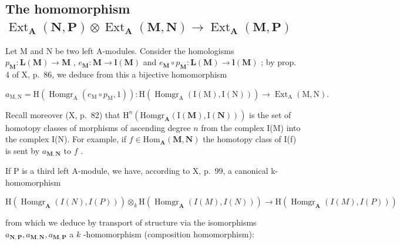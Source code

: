 \subsection{\texorpdfstring{The homomorphism \(\operatorname{Ext}_{\mathbf{A}}(\mathbf{N}, \mathbf{P}) \otimes \operatorname{Ext}_{\mathbf{A}}(\mathbf{M}, \mathbf{N}) \to \operatorname{Ext}_{\mathbf{A}}(\mathbf{M}, \mathbf{P})\)}{The homomorphism \textbackslash operatorname\{Ext\}\_\{\textbackslash mathbf\{A\}\}(\textbackslash mathbf\{N\}, \textbackslash mathbf\{P\}) \textbackslash otimes \textbackslash operatorname\{Ext\}\_\{\textbackslash mathbf\{A\}\}(\textbackslash mathbf\{M\}, \textbackslash mathbf\{N\}) \textbackslash to \textbackslash operatorname\{Ext\}\_\{\textbackslash mathbf\{A\}\}(\textbackslash mathbf\{M\}, \textbackslash mathbf\{P\})}}

Let M and N be two left A-modules. Consider the homologisms \(p_{\mathbf{M}}: \mathbf{L}(\mathbf{M}) \to \mathbf{M}\) , \(e_{\mathbf{M}}: \mathbf{M} \to \mathbf{l}(\mathbf{M})\) and \(e_{\mathbf{M}} \circ p_{\mathbf{M}}: \mathbf{L}(\mathbf{M}) \to \mathbf{l}(\mathbf{M})\) ; by prop. 4 of X, p.~86, we deduce from this a bijective homomorphism

\[
a _ {\mathrm{M}, \mathrm{N}} = \mathrm{H} (\operatorname{Homgr} _ {\mathrm{A}} (e _ {\mathrm{M}} \circ p _ {\mathrm{M}}, 1)): \mathrm{H} (\operatorname{Homgr} _ {\mathrm{A}} (\mathrm{I} (\mathrm{M}), \mathrm{I} (\mathrm{N}))) \rightarrow \operatorname{Ext} _ {\mathrm{A}} (\mathrm{M}, \mathrm{N}).
\]

Recall moreover (X, p.~82) that \(\mathrm{H}^n (\mathrm{Homgr}_{\mathbf{A}}(\mathrm{I}(\mathbf{M}),\mathrm{I}(\mathbf{N})))\) is the set of homotopy classes of morphisms of ascending degree \(n\) from the complex I(M) into the complex I(N). For example, if \(f\in \mathrm{Hom}_{\mathbf{A}}(\mathbf{M},\mathbf{N})\) the homotopy class of I(f) is sent by \(a_{\mathbf{M},\mathbf{N}}\) to \(f\) .

If P is a third left A-module, we have, according to X, p.~99, a canonical k-homomorphism

\[
\mathrm{H} (\operatorname{Homgr} _ {\mathbf {A}} (I (N), I (P))) \otimes_ {k} \mathrm{H} (\operatorname{Homgr} _ {\mathbf {A}} (I (M), I (N))) \rightarrow \mathrm{H} (\operatorname{Homgr} _ {\mathbf {A}} (I (M), I (P)))
\]

from which we deduce by transport of structure via the isomorphisms \(a_{\mathbf{N},\mathbf{P}}, a_{\mathbf{M},\mathbf{N}}, a_{\mathbf{M},\mathbf{P}}\) a \(k\) -homomorphism (composition homomorphism):

